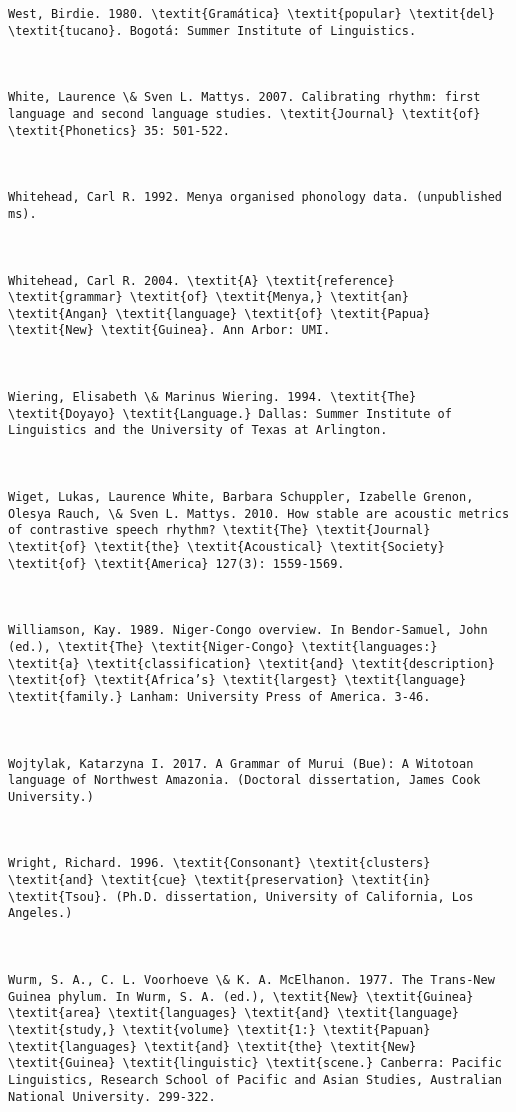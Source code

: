 \begin{verbatim}
West, Birdie. 1980. \textit{Gramática} \textit{popular} \textit{del} \textit{tucano}. Bogotá: Summer Institute of Linguistics.



White, Laurence \& Sven L. Mattys. 2007. Calibrating rhythm: first language and second language studies. \textit{Journal} \textit{of} \textit{Phonetics} 35: 501-522.



Whitehead, Carl R. 1992. Menya organised phonology data. (unpublished ms).



Whitehead, Carl R. 2004. \textit{A} \textit{reference} \textit{grammar} \textit{of} \textit{Menya,} \textit{an} \textit{Angan} \textit{language} \textit{of} \textit{Papua} \textit{New} \textit{Guinea}. Ann Arbor: UMI.



Wiering, Elisabeth \& Marinus Wiering. 1994. \textit{The} \textit{Doyayo} \textit{Language.} Dallas: Summer Institute of Linguistics and the University of Texas at Arlington.



Wiget, Lukas, Laurence White, Barbara Schuppler, Izabelle Grenon, Olesya Rauch, \& Sven L. Mattys. 2010. How stable are acoustic metrics of contrastive speech rhythm? \textit{The} \textit{Journal} \textit{of} \textit{the} \textit{Acoustical} \textit{Society} \textit{of} \textit{America} 127(3): 1559-1569.



Williamson, Kay. 1989. Niger-Congo overview. In Bendor-Samuel, John (ed.), \textit{The} \textit{Niger-Congo} \textit{languages:} \textit{a} \textit{classification} \textit{and} \textit{description} \textit{of} \textit{Africa’s} \textit{largest} \textit{language} \textit{family.} Lanham: University Press of America. 3-46.



Wojtylak, Katarzyna I. 2017. A Grammar of Murui (Bue): A Witotoan language of Northwest Amazonia. (Doctoral dissertation, James Cook University.)



Wright, Richard. 1996. \textit{Consonant} \textit{clusters} \textit{and} \textit{cue} \textit{preservation} \textit{in} \textit{Tsou}. (Ph.D. dissertation, University of California, Los Angeles.)



Wurm, S. A., C. L. Voorhoeve \& K. A. McElhanon. 1977. The Trans-New Guinea phylum. In Wurm, S. A. (ed.), \textit{New} \textit{Guinea} \textit{area} \textit{languages} \textit{and} \textit{language} \textit{study,} \textit{volume} \textit{1:} \textit{Papuan} \textit{languages} \textit{and} \textit{the} \textit{New} \textit{Guinea} \textit{linguistic} \textit{scene.} Canberra: Pacific Linguistics, Research School of Pacific and Asian Studies, Australian National University. 299-322.




\end{verbatim}
